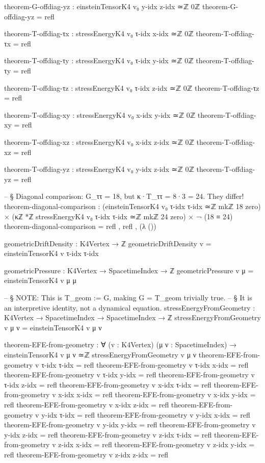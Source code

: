 \documentclass[11pt,a4paper]{book}
\begin{document}
\begin{code}
theorem-G-offdiag-yz : einsteinTensorK4 v₀ y-idx z-idx ≃ℤ 0ℤ
theorem-G-offdiag-yz = refl

theorem-T-offdiag-τx : stressEnergyK4 v₀ τ-idx x-idx ≃ℤ 0ℤ
theorem-T-offdiag-τx = refl

theorem-T-offdiag-τy : stressEnergyK4 v₀ τ-idx y-idx ≃ℤ 0ℤ
theorem-T-offdiag-τy = refl

theorem-T-offdiag-τz : stressEnergyK4 v₀ τ-idx z-idx ≃ℤ 0ℤ
theorem-T-offdiag-τz = refl

theorem-T-offdiag-xy : stressEnergyK4 v₀ x-idx y-idx ≃ℤ 0ℤ
theorem-T-offdiag-xy = refl

theorem-T-offdiag-xz : stressEnergyK4 v₀ x-idx z-idx ≃ℤ 0ℤ
theorem-T-offdiag-xz = refl

theorem-T-offdiag-yz : stressEnergyK4 v₀ y-idx z-idx ≃ℤ 0ℤ
theorem-T-offdiag-yz = refl







-- § Diagonal comparison: G_ττ = 18, but κ·T_ττ = 8·3 = 24. They differ!
theorem-diagonal-comparison : 
  (einsteinTensorK4 v₀ τ-idx τ-idx ≃ℤ mkℤ 18 zero) × 
  (κℤ *ℤ stressEnergyK4 v₀ τ-idx τ-idx ≃ℤ mkℤ 24 zero) ×
  ¬ (18 ≡ 24)
theorem-diagonal-comparison = refl , refl , (λ ())

geometricDriftDensity : K4Vertex → ℤ
geometricDriftDensity v = einsteinTensorK4 v τ-idx τ-idx

geometricPressure : K4Vertex → SpacetimeIndex → ℤ
geometricPressure v μ = einsteinTensorK4 v μ μ

-- § NOTE: This is T_geom := G, making G = T_geom trivially true.
-- § It is an interpretive identity, not a dynamical equation.
stressEnergyFromGeometry : K4Vertex → SpacetimeIndex → SpacetimeIndex → ℤ
stressEnergyFromGeometry v μ ν = 
  einsteinTensorK4 v μ ν

theorem-EFE-from-geometry : ∀ (v : K4Vertex) (μ ν : SpacetimeIndex) →
  einsteinTensorK4 v μ ν ≃ℤ stressEnergyFromGeometry v μ ν
theorem-EFE-from-geometry v τ-idx τ-idx = refl
theorem-EFE-from-geometry v τ-idx x-idx = refl
theorem-EFE-from-geometry v τ-idx y-idx = refl
theorem-EFE-from-geometry v τ-idx z-idx = refl
theorem-EFE-from-geometry v x-idx τ-idx = refl
theorem-EFE-from-geometry v x-idx x-idx = refl
theorem-EFE-from-geometry v x-idx y-idx = refl
theorem-EFE-from-geometry v x-idx z-idx = refl
theorem-EFE-from-geometry v y-idx τ-idx = refl
theorem-EFE-from-geometry v y-idx x-idx = refl
theorem-EFE-from-geometry v y-idx y-idx = refl
theorem-EFE-from-geometry v y-idx z-idx = refl
theorem-EFE-from-geometry v z-idx τ-idx = refl
theorem-EFE-from-geometry v z-idx x-idx = refl
theorem-EFE-from-geometry v z-idx y-idx = refl
theorem-EFE-from-geometry v z-idx z-idx = refl


\end{code}
\end{document}
